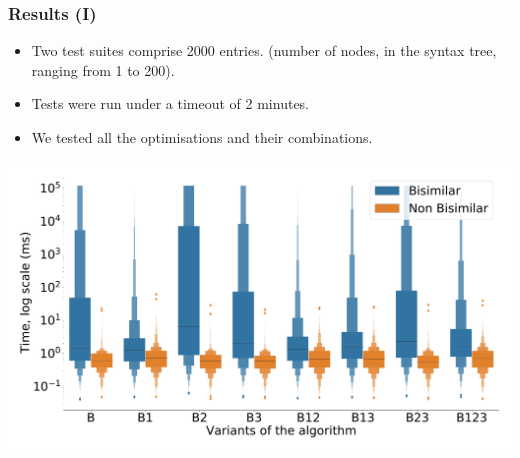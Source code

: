 \documentclass[10pt]{beamer}
\begin{document}



\begin{frame}
  \frametitle{Results (I)}
  \begin{itemize}
  \item Two test suites comprise 2000 entries. (number of
    nodes, in the syntax tree, ranging from 1 to 200).    
  \item Tests were run under a timeout of 2 minutes.
  \item We tested all the optimisations and their combinations.    
  \end{itemize}
  \pause
  \includegraphics[scale=0.20]{img/distribution_boxplot.pdf}
\end{frame}
\end{document}
